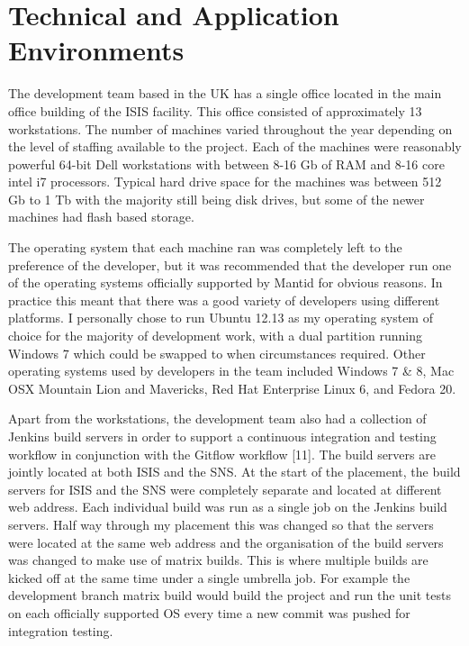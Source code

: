 \documentclass[paper=a4, fontsize=11pt]{scrartcl}	%
\numberwithin{equation}{section}															%
\numberwithin{figure}{section}																%
\numberwithin{table}{section}
\begin{document}
\clearpage
\section{Technical and Application
Environments}\label{technical-and-application-environments}

The development team based in the UK has a single office located in the
main office building of the ISIS facility. This office consisted of
approximately 13 workstations. The number of machines varied throughout
the year depending on the level of staffing available to the project.
Each of the machines were reasonably powerful 64-bit Dell workstations
with between 8-16 Gb of RAM and 8-16 core intel i7 processors. Typical
hard drive space for the machines was between 512 Gb to 1 Tb with the
majority still being disk drives, but some of the newer machines had
flash based storage.

The operating system that each machine ran was completely left to the
preference of the developer, but it was recommended that the developer
run one of the operating systems officially supported by Mantid for
obvious reasons. In practice this meant that there was a good variety of
developers using different platforms. I personally chose to run Ubuntu
12.13 as my operating system of choice for the majority of development
work, with a dual partition running Windows 7 which could be swapped to
when circumstances required. Other operating systems used by developers
in the team included Windows 7 \& 8, Mac OSX Mountain Lion and
Mavericks, Red Hat Enterprise Linux 6, and Fedora 20.

Apart from the workstations, the development team also had a collection of
Jenkins build servers in order to support a continuous integration and
testing workflow in conjunction with the Gitflow workflow {[}11{]}. The
build servers are jointly located at both ISIS and the SNS. At the start
of the placement, the build servers for ISIS and the SNS were completely
separate and located at different web address. Each individual build was
run as a single job on the Jenkins build servers. Half way through my
placement this was changed so that the servers were located at the same
web address and the organisation of the build servers was changed to
make use of matrix builds. This is where multiple builds are kicked
off at the same time under a single umbrella job. For example the
development branch matrix build would build the project and run the unit
tests on each officially supported OS every time a new commit was pushed
for integration testing.
\end{document}
